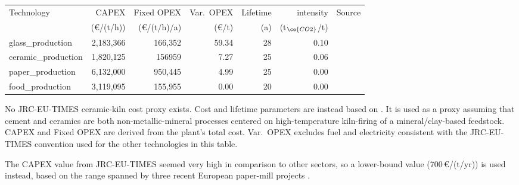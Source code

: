 \begin{table}[h!]
	\centering
	\label{table:SIProductionCost}
	\begin{threeparttable}
	\begin{tabular}{>{\raggedright\arraybackslash}p{20mm}rrrrrl}
		\toprule
		Technology & CAPEX & Fixed OPEX & Var.\ OPEX & Lifetime & \ce{CO2} intensity & Source \\
		 & (\euro/(t/h)) & (\euro/(t/h)/a) & (\euro/t) & (a) & (t$_{\ce{CO2}}$/t) & \\
		\midrule
		glass\_\allowbreak production & 2{,}183{,}366 & 166{,}352 & 59.34 & 28 & 0.10 & \cite{AIDRES2023,JRCEUTIMES2013} \\
		ceramic\_\allowbreak production\tnote{a} & 1{,}820{,}125& 156959& 7.27& 25& 0.06 & \cite{Rehfeldt2017, Gardarsdottir2019} \\ 
		paper\_\allowbreak production & 6{,}132{,}000\tnote{b} & 950{,}445 & 4.99 & 25 & 0.00 & \cite{JRCEUTIMES2013,StoraEnso2026,StoraEnso2022,AsiaPaper2016} \\
		food\_\allowbreak production & 3{,}119{,}095 & 155{,}955 & 0.00 & 20 & 0.00 & \cite{JRCEUTIMES2013} \\
		\bottomrule
	\end{tabular}
	\begin{tablenotes}
		\footnotesize
		\item[a] No JRC-EU-TIMES ceramic-kiln cost proxy exists. Cost and lifetime parameters are instead based on \cite{Gardarsdottir2019}. It is used as a proxy assuming that cement and ceramics are both non-metallic-mineral processes centered on high-temperature kiln-firing of a mineral/clay-based feedstock. CAPEX and Fixed OPEX are derived from the plant's total cost. Var.\ OPEX excludes fuel and electricity consistent with the JRC-EU-TIMES convention used for the other technologies in this table.
		\item[b] The CAPEX value from JRC-EU-TIMES seemed very high in comparison to other sectors, so a lower-bound value (700\,\euro/(t/yr)) is used instead, based on the range spanned by three recent European paper-mill projects \cite{StoraEnso2026,StoraEnso2022,AsiaPaper2016}.
	\end{tablenotes}
	\end{threeparttable}
\end{table}

